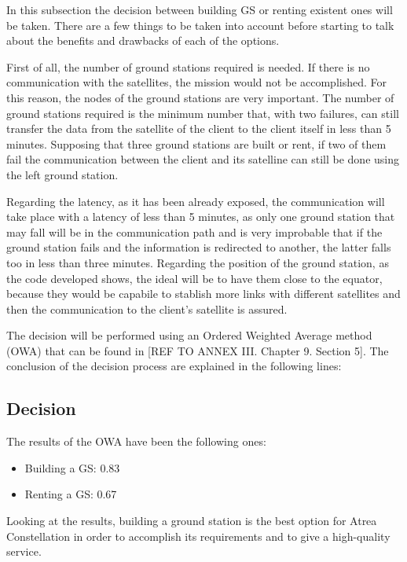 In this subsection the decision between building GS or renting existent ones will be taken. There are a few things to be taken into account before starting to talk about the benefits and drawbacks of each of the options.

First of all, the number of ground stations required is needed. If there is no communication with the satellites, the mission would not be accomplished. For this reason, the nodes of the ground stations are very important. The number of ground stations required is the minimum number that, with two failures, can still transfer the data from the satellite of the client to the client itself in less than 5 minutes. Supposing that three ground stations are built or rent, if two of them fail the communication between the client and its satelline can still be done using the left ground station.

Regarding the latency, as it has been already exposed, the communication will take place with a latency of less than 5 minutes, as only one ground station that may fall will be in the communication path and is very improbable that if the ground station fails and the information is redirected to another, the latter falls too in less than three minutes. Regarding the position of the ground station, as the code developed shows, the ideal will be to have them close to the equator, because they would be capabile to stablish more links with different satellites and then the communication to the client's satellite is assured.

The decision will be performed using an Ordered Weighted Average method (OWA) that can be found in [{REF TO ANNEX III. Chapter 9. Section 5}]. The conclusion of the decision process are explained in the following lines:

\subsection{Decision}
The results of the OWA have been the following ones:
\begin{itemize}
\item Building a GS: 0.83
\item Renting a GS: 0.67
\end{itemize}

Looking at the results, building a ground station is the best option for Atrea Constellation in order to accomplish its requirements and to give a high-quality service.